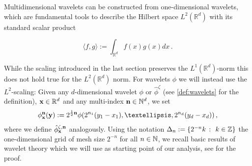 \documentclass[12pt]{article}
\numberwithin{equation}{section}
\theoremstyle{plain}
\theoremstyle{definition}
\newcommand{\R}{\ensuremath{{\mathbb R}}}
\def\bR{\mathbb{R}}\def\bS{\mathbb{S}}
\def\fy{\mathbf y}\def\fz{\mathbf z}
\begin{document}
Multidimensional wavelets can be constructed from one-dimensional wavelets, which are fundamental tools to describe the Hilbert space $L^2(\R^d)$ with its standard scalar product

\[
\langle f,g\rangle:= \int_{\R^d}f(x)g(x)dx\,.
\]

 While the scaling introduced in the last section preserves the $L^1(\bR^d)$-norm this does not hold true for the $L^2(\bR^d)$ norm. For wavelets $\phi$  we will instead use the $L^2$-scaling: Given any $d$-dimensional wavelet $\phi$ or $\hat\phi^\zeta$ (see \eqref{def:wavelets} for the definition), $\fx\in\bR^d$ and any multi-index $\mathbf n\in\mathbb{N}^d$, we set
\[
    \phi^\fn_\fx(\fy) := 2^{\frac{1}2\fn} \phi(2^{n_1}(y_1-x_1), \ldots , 2^{n_d}(y_d-x_d))\,,
\]
where we define $\hat\phi^{\zeta,\mathbf n}_\mathbf x$ analogously.  Using the notation $\Delta_n := \{2^{-n} k~\colon~ k\in\mathbb{Z}\}$ the one-dimensional grid of mesh size $2^{-n}$ for all $n\in\mathbb{N}$, we recall basic results of wavelet theory which we will use as starting point of our analysis, see \cite[ Chapter 3]{meyer} for the proof. 
\end{document}
